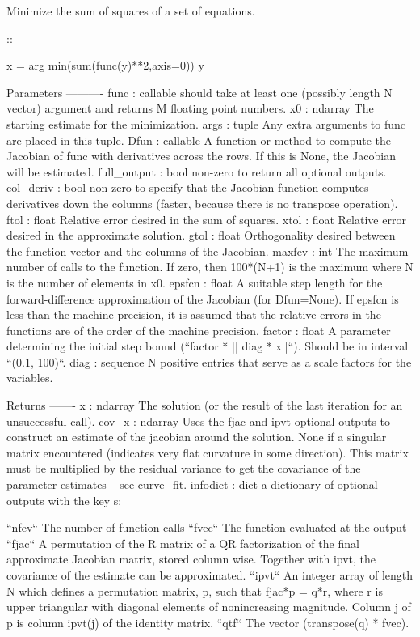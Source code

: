 \begin{DoxyVerb}Minimize the sum of squares of a set of equations.

::

    x = arg min(sum(func(y)**2,axis=0))
             y

Parameters
----------
func : callable
    should take at least one (possibly length N vector) argument and
    returns M floating point numbers.
x0 : ndarray
    The starting estimate for the minimization.
args : tuple
    Any extra arguments to func are placed in this tuple.
Dfun : callable
    A function or method to compute the Jacobian of func with derivatives
    across the rows. If this is None, the Jacobian will be estimated.
full_output : bool
    non-zero to return all optional outputs.
col_deriv : bool
    non-zero to specify that the Jacobian function computes derivatives
    down the columns (faster, because there is no transpose operation).
ftol : float
    Relative error desired in the sum of squares.
xtol : float
    Relative error desired in the approximate solution.
gtol : float
    Orthogonality desired between the function vector and the columns of
    the Jacobian.
maxfev : int
    The maximum number of calls to the function. If zero, then 100*(N+1) is
    the maximum where N is the number of elements in x0.
epsfcn : float
    A suitable step length for the forward-difference approximation of the
    Jacobian (for Dfun=None). If epsfcn is less than the machine precision,
    it is assumed that the relative errors in the functions are of the
    order of the machine precision.
factor : float
    A parameter determining the initial step bound
    (``factor * || diag * x||``). Should be in interval ``(0.1, 100)``.
diag : sequence
    N positive entries that serve as a scale factors for the variables.

Returns
-------
x : ndarray
    The solution (or the result of the last iteration for an unsuccessful
    call).
cov_x : ndarray
    Uses the fjac and ipvt optional outputs to construct an
    estimate of the jacobian around the solution. None if a
    singular matrix encountered (indicates very flat curvature in
    some direction).  This matrix must be multiplied by the
    residual variance to get the covariance of the
    parameter estimates -- see curve_fit.
infodict : dict
    a dictionary of optional outputs with the key s:

    ``nfev``
        The number of function calls
    ``fvec``
        The function evaluated at the output
    ``fjac``
        A permutation of the R matrix of a QR
        factorization of the final approximate
        Jacobian matrix, stored column wise.
        Together with ipvt, the covariance of the
        estimate can be approximated.
    ``ipvt``
        An integer array of length N which defines
        a permutation matrix, p, such that
        fjac*p = q*r, where r is upper triangular
        with diagonal elements of nonincreasing
        magnitude. Column j of p is column ipvt(j)
        of the identity matrix.
    ``qtf``
        The vector (transpose(q) * fvec).


\end{DoxyVerb}
